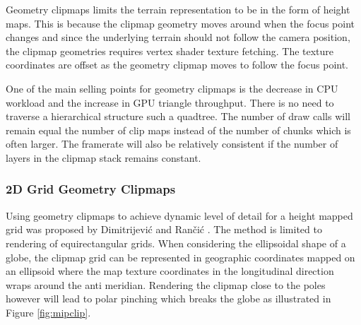 Geometry clipmaps limits the terrain representation to be in the form of height maps. This is because the clipmap geometry moves around when the focus point changes and since the underlying terrain should not follow the camera position, the clipmap geometries requires vertex shader texture fetching. The texture coordinates are offset as the geometry clipmap moves to follow the focus point.

One of the main selling points for geometry clipmaps is the decrease in CPU workload and the increase in GPU triangle throughput. There is no need to traverse a hierarchical structure such a quadtree. The number of draw calls will remain equal the number of clip maps instead of the number of chunks which is often larger. The framerate will also be relatively consistent if the number of layers in the clipmap stack remains constant.

\subsubsection{2D Grid Geometry Clipmaps}
Using geometry clipmaps to achieve dynamic level of detail for a height mapped grid was proposed by Dimitrijevi\'{c} and Ran\v{c}i\'{c} \cite{dimi15}. The method is limited to rendering of equirectangular grids. When considering the ellipsoidal shape of a globe, the clipmap grid can be represented in geographic coordinates mapped on an ellipsoid where the map texture coordinates in the longitudinal direction wraps around the anti meridian. Rendering the clipmap close to the poles however will lead to polar pinching which breaks the globe as illustrated in Figure \ref{fig:mipclip}.

